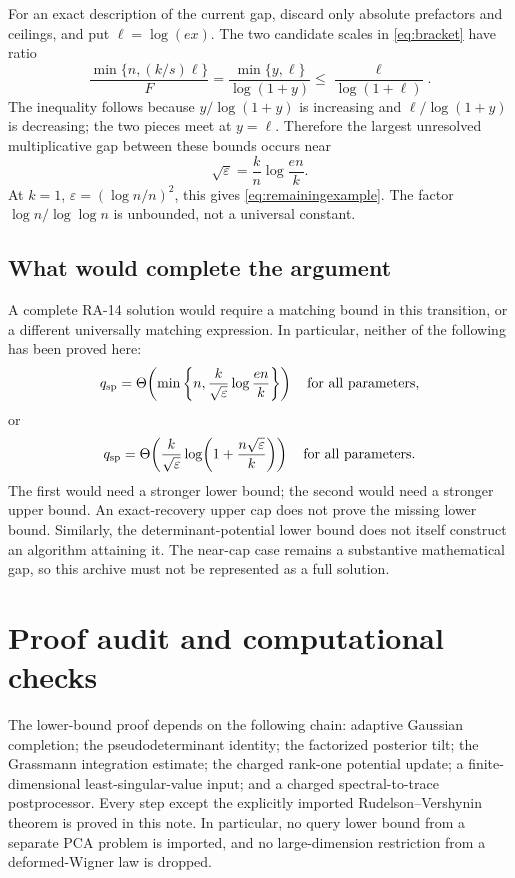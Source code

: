 \documentclass[11pt]{article}
\numberwithin{equation}{section}
\theoremstyle{remark}\newtheorem{remark}[theorem]{Remark}
\newcommand{\eps}{\varepsilon}
\newcommand{\qsp}{q_{\mathrm{sp}}}
\begin{document}
For an exact description of the current gap, discard only absolute prefactors and ceilings, and put $\ell=\log(ex)$. The two candidate scales in \eqref{eq:bracket} have ratio
\begin{equation}\label{eq:gapratio}
\frac{\min\{n,(k/s)\ell\}}{F}
=\frac{\min\{y,\ell\}}{\log(1+y)}
\le\frac{\ell}{\log(1+\ell)}.
\end{equation}
The inequality follows because $y/\log(1+y)$ is increasing and $\ell/\log(1+y)$ is decreasing; the two pieces meet at $y=\ell$. Therefore the largest unresolved multiplicative gap between these bounds occurs near
\[
\sqrt\eps=\frac{k}{n}\log\frac{en}{k}.
\]
At $k=1$, $\eps=(\log n/n)^2$, this gives \eqref{eq:remainingexample}. The factor $\log n/\log\log n$ is unbounded, not a universal constant.

\subsection{What would complete the argument}
A complete RA-14 solution would require a matching bound in this transition, or a different universally matching expression. In particular, neither of the following has been proved here:
\[
\qsp=\Theta\!\left(\min\left\{n,\frac{k}{\sqrt\eps}\log\frac{en}{k}\right\}\right)
\quad\hbox{for all parameters},
\]
or
\[
\qsp=\Theta\!\left(\frac{k}{\sqrt\eps}\log\!\left(1+\frac{n\sqrt\eps}{k}\right)\right)
\quad\hbox{for all parameters}.
\]
The first would need a stronger lower bound; the second would need a stronger upper bound. An exact-recovery upper cap does not prove the missing lower bound. Similarly, the determinant-potential lower bound does not itself construct an algorithm attaining it. The near-cap case remains a substantive mathematical gap, so this archive must not be represented as a full solution.

\section{Proof audit and computational checks}\label{sec:checks}
The lower-bound proof depends on the following chain: adaptive Gaussian completion; the pseudodeterminant identity; the factorized posterior tilt; the Grassmann integration estimate; the charged rank-one potential update; a finite-dimensional least-singular-value input; and a charged spectral-to-trace postprocessor. Every step except the explicitly imported Rudelson--Vershynin theorem is proved in this note. In particular, no query lower bound from a separate PCA problem is imported, and no large-dimension restriction from a deformed-Wigner law is dropped.
\end{document}
